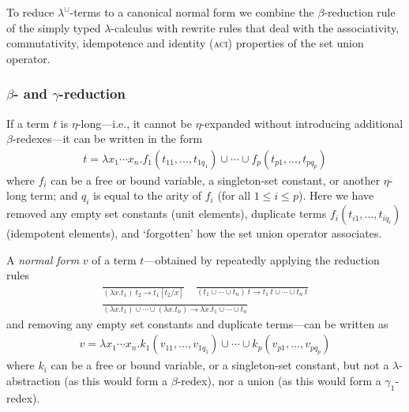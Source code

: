 \documentclass{llncs}
\renewcommand{\leq}{\leqslant}
\newcommand{\VER}{\\[1.5ex]}
\newcommand{\RulX}[3]{\frac{#2}{#3}}
\newcommand{\ACIone}{\textsc{aci}\oldstylenums{1}\xspace}
\newcommand{\LambdaUnion}{\lambda^\cup}
\newcommand{\ClassVar}{\mathbf{Var}}
\newcommand{\ClassCon}{\mathbf{Con}}
\begin{document}
To reduce $\LambdaUnion$-terms to a canonical normal form we combine the $\beta$-reduction rule of the simply typed $\lambda$-calculus with rewrite rules that deal with the associativity, commutativity, idempotence and identity (\ACIone) properties of the set union operator.

\subsubsection{$\beta$- and $\gamma$-reduction}

If a term $t$ is $\eta$-long---i.e., it cannot be $\eta$-expanded without introducing additional $\beta$-redexes---it can be written in the form
\begin{align*}
    t = \lambda x_1 \cdots x_n. f_1(t_{11}, ..., t_{1q_1}) \cup \cdots \cup f_p(t_{p1}, ..., t_{pq_p})
\end{align*}
where $f_i$ can be a free or bound variable, a singleton-set constant, or another $\eta$-long term; and $q_i$ is equal to the arity of $f_i$ (for all $1 \leq i \leq p$).
Here we have removed any empty set constants (unit elements), duplicate terms $f_i(t_{i1}, ..., t_{iq_i})$ (idempotent elements), and `forgotten' how the set union operator associates.

A \emph{normal form} $v$ of a term $t$---obtained by repeatedly applying the reduction rules
    \begin{gather*}
        \RulX{R-Beta}
             {
             }
             {(\lambda x.t_1)\ t_2 \longrightarrow t_1\left[t_2 / x\right]
             }
        \quad
        \RulX{R-Gamma$_1$}
             {
             }
             {(t_1 \cup \cdots \cup t_n) \ t \longrightarrow t_1\ t \cup \cdots \cup t_n\ t
             }
        \VER
        \RulX{R-Gamma$_2$}
             {
             }
             {(\lambda x.t_1) \cup \cdots \cup (\lambda x.t_n) \longrightarrow \lambda x.t_1 \cup \cdots \cup t_n
             }
    \end{gather*}
and removing any empty set constants and duplicate terms---can be written as
\begin{align*}
    v = \lambda x_1 \cdots x_n. k_1(v_{11}, ..., v_{1q_1}) \cup \cdots \cup k_p(v_{p1}, ..., v_{pq_p})
\end{align*}
where $k_i$ can be a free or bound variable, or a singleton-set constant, but not a $\lambda$-abstraction (as this would form a $\beta$-redex), nor a union (as this would form a $\gamma_1$-redex).
\end{document}
